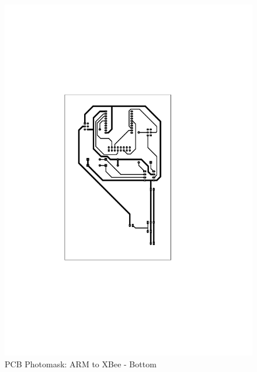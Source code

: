 \begin{figure}[H]
\begin{center}
\includegraphics[scale=0.6]{figures/ARM2XBee_bottom}
\end{center}
\caption{PCB Photomask: ARM to XBee - Bottom}
\label{fig:ARM2XBee2}
\end{figure}
